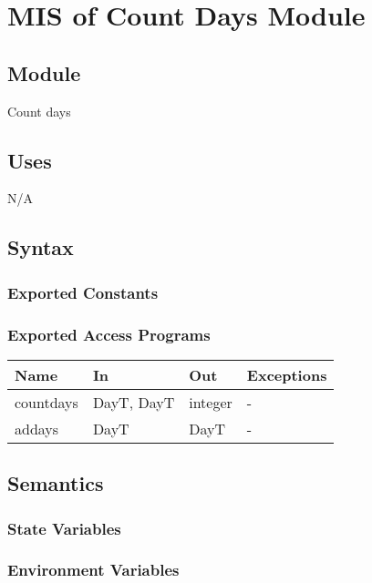 \documentclass[12pt, titlepage]{article}
\begin{document}
\section{MIS of Count Days Module} \label{ModuleDD} 
\subsection{Module}
Count days


\subsection{Uses}
N/A

\subsection{Syntax}

\subsubsection{Exported Constants}


\subsubsection{Exported Access Programs}

\begin{center}
\begin{tabular}{p{2cm} p{4cm} p{4cm} p{2cm}}
\hline
\textbf{Name} & \textbf{In} & \textbf{Out} & \textbf{Exceptions} \\
\hline 
countdays & DayT, DayT & integer & - \\
addays & DayT & DayT & - \\

\hline
\end{tabular}
\end{center}

\subsection{Semantics}

\subsubsection{State Variables}



\subsubsection{Environment Variables}
\end{document}
